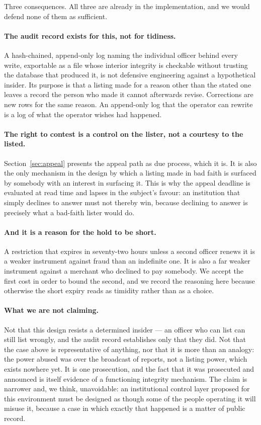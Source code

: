 \documentclass[10pt,a4paper,twocolumn]{article}
\begin{document}
Three consequences. All three are already in the implementation, and we would
defend none of them as sufficient.

\paragraph{The audit record exists for this, not for tidiness.} A hash-chained,
append-only log naming the individual officer behind every write, exportable as
a file whose interior integrity is checkable without trusting the database that
produced it, is not defensive engineering against a hypothetical insider. Its
purpose is that a listing made for a reason other than the stated one leaves a
record the person who made it cannot afterwards revise. Corrections are new rows
for the same reason. An append-only log that the operator can rewrite is a log
of what the operator wishes had happened.

\paragraph{The right to contest is a control on the lister, not a courtesy to
the listed.} Section~\ref{sec:appeal} presents the appeal path as due process,
which it is. It is also the only mechanism in the design by which a listing made
in bad faith is surfaced by somebody with an interest in surfacing it. This is
why the appeal deadline is evaluated at read time and lapses in the subject's
favour: an institution that simply declines to answer must not thereby win,
because declining to answer is precisely what a bad-faith lister would do.

\paragraph{And it is a reason for the hold to be short.} A restriction that
expires in seventy-two hours unless a second officer renews it is a weaker
instrument against fraud than an indefinite one. It is also a far weaker
instrument against a merchant who declined to pay somebody. We accept the first
cost in order to bound the second, and we record the reasoning here because
otherwise the short expiry reads as timidity rather than as a choice.

\paragraph{What we are not claiming.} Not that this design resists a determined
insider --- an officer who can list can still list wrongly, and the audit record
establishes only that they did. Not that the case above is representative of
anything, nor that it is more than an analogy: the power abused was over the
broadcast of reports, not a listing power, which exists nowhere yet. It is one
prosecution, and the fact that it was prosecuted and
announced is itself evidence of a functioning integrity mechanism. The claim is
narrower and, we think, unavoidable: an institutional control layer proposed for
this environment must be designed as though some of the people operating it will
misuse it, because a case in which exactly that happened is a matter of public
record.
\end{document}
